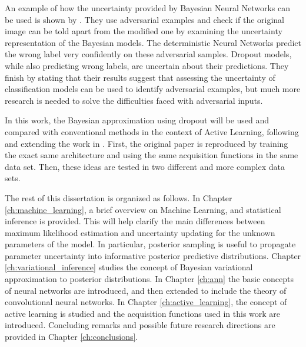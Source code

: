 An example of how the uncertainty provided by Bayesian Neural Networks can be used is shown by \citeauthor{li2017dropout} \cite{li2017dropout}. They use adversarial examples and check if the original image can be told apart from the modified one by examining the uncertainty representation of the Bayesian models. The deterministic Neural Networks predict the wrong label very confidently on these adversarial samples. Dropout models, while also predicting wrong labels, are uncertain about their predictions. They finish by stating that their results suggest that assessing the uncertainty of classification models can be used to identify adversarial examples, but much more research is needed to solve the difficulties faced with adversarial inputs.


In this work, the Bayesian approximation using dropout will be used and compared with conventional methods in the context of Active Learning, following and extending the work in \cite{Gal2016Active}. First, the original paper is reproduced by training the exact same architecture and using the same acquisition functions in the same data set. Then, these ideas are tested in two different and more complex data sets.

The rest of this dissertation is organized as follows. In Chapter \ref{ch:machine_learning}, a brief overview on Machine Learning, and statistical inference is provided. This will help clarify the main differences between maximum likelihood estimation and uncertainty updating for the unknown parameters of the model. In particular, posterior sampling is useful to propagate parameter uncertainty into informative posterior predictive distributions. Chapter \ref{ch:variational_inference} studies the concept of Bayesian variational approximation to posterior distributions. In Chapter \ref{ch:ann} the basic concepts of neural networks are introduced, and then extended to include the theory of convolutional neural networks. In Chapter \ref{ch:active_learning}, the concept of active learning is studied and the acquisition functions used in this work are introduced. Concluding remarks and possible future research directions are provided in Chapter \ref{ch:conclusions}.
